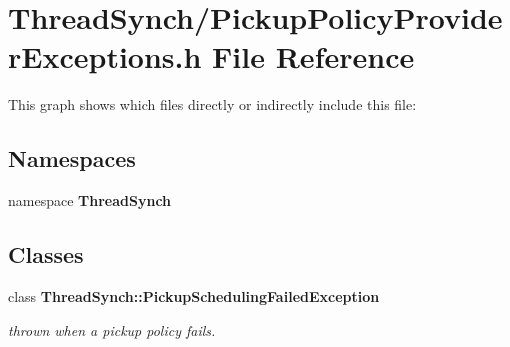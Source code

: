 \section{Thread\-Synch/Pickup\-Policy\-Provider\-Exceptions.h File Reference}
\label{_pickup_policy_provider_exceptions_8h}


This graph shows which files directly or indirectly include this file:\subsection*{Namespaces}
\begin{CompactItemize}
\item 
namespace {\bf Thread\-Synch}
\end{CompactItemize}
\subsection*{Classes}
\begin{CompactItemize}
\item 
class {\bf Thread\-Synch::Pickup\-Scheduling\-Failed\-Exception}
\begin{CompactList}\small\item\em thrown when a pickup policy fails. \item\end{CompactList}\end{CompactItemize}
